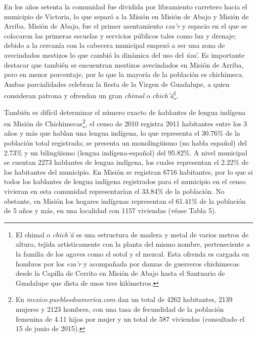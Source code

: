 \documentclass[output=paper]{../langscibook}
\begin{document}
En los años setenta la comunidad fue dividida por libramiento carretero hacia el municipio de Victoria, lo que separó a la Misión en Misión de Abajo y Misión de Arriba. Misión de Abajo, fue el primer asentamiento \textit{eza’r} y espacio en el que se colocaron las primeras escuelas y servicios públicos tales como luz y drenaje; debido a la cercanía con la cabecera municipal empezó a ser una zona de avecindados mestizos lo que cambió la dinámica del uso del \textit{úza}’. Es importante destacar que también se encuentran mestizos avecindados en Misión de Arriba, pero en menor porcentaje, por lo que la mayoría de la población es chichimeca. Ambas parcialidades celebran la fiesta de la Virgen de Guadalupe, a quien consideran patrona y ofrendan un gran \textit{chimal} o \textit{chich’á}\footnote{El chimal o \textit{chich’á} es una estructura de madera y metal de varios metros de altura, tejida artísticamente con la planta del mismo nombre, perteneciente a la familia de los agaves como el sotol y el mezcal. Esta ofrenda es cargada en hombros por los \textit{eza’r} y acompañada por danzas de guerreros chichimecas desde la Capilla de Cerrito en Misión de Abajo hasta el Santuario de Guadalupe que dista de unos tres kilómetros.}.

También es difícil determinar el número exacto de hablantes de lengua indígena en Misión de Chichimecas\footnote{En \textit{mexico.pueblosdeamerica.com} dan un total de 4262 habitantes, 2139 mujeres y 2123 hombres, con una tasa de fecundidad de la población femenina de 4.11 hijos por mujer y un total de 587 viviendas (consultado el 15 de junio de 2015).}, el censo de 2010 registra 2011 habitantes entre los 3 años y más que hablan una lengua indígena, lo que representa el 30.76\% de la población total registrada; se presenta un monolingüismo (no habla español) del 2.73\% y un bilingüismo (lengua indígena-español) del 95.82\%. A nivel municipal se cuentan 2273 hablantes de lengua indígena, los cuales representan el 2.22\% de los habitantes del municipio. En Misión se registran 6716 habitantes, por lo que si todos los hablantes de lengua indígena registrados para el municipio en el censo vivieran en esta comunidad representarían el 33.84\% de la población. No obstante, en Misión los hogares indígenas representan el 61.41\% de la población de 5 años y más, en una localidad con 1157 viviendas (véase Tabla 5).
\end{document}
